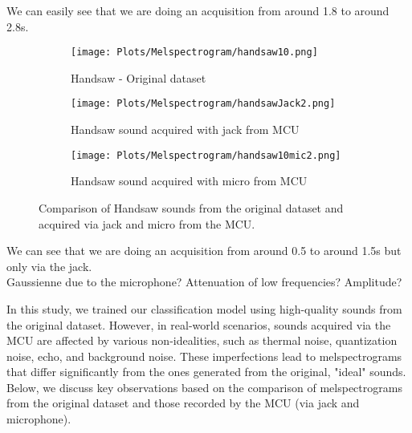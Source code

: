 \documentclass{article}
\begin{document}
We can easily see that we are doing an acquisition from around 1.8 to around 2.8s.
\begin{figure}[H]
    \centering
    \begin{subfigure}{0.35\linewidth} %
        \centering
        \texttt{[image: Plots/Melspectrogram/handsaw10.png]}
        \caption{Handsaw - Original dataset}
    \end{subfigure}
    \hfill
    \begin{subfigure}{0.27\linewidth} %
        \centering
        \texttt{[image: Plots/Melspectrogram/handsawJack2.png]}
        \caption{Handsaw sound acquired with jack from MCU}
    \end{subfigure}
    \hfill
    \begin{subfigure}{0.27\linewidth} %
        \centering
        \texttt{[image: Plots/Melspectrogram/handsaw10mic2.png]}
        \caption{Handsaw sound acquired with micro from MCU}
    \end{subfigure}
    \caption{Comparison of Handsaw sounds from the original dataset and  acquired via jack and micro from the MCU.}
\end{figure}
We can see that we are doing an acquisition from around 0.5 to around 1.5s but only via the jack.\\
Gaussienne due to the microphone? Attenuation of low frequencies? Amplitude?


In this study, we trained our classification model using high-quality sounds from the original dataset. However, in real-world scenarios, sounds acquired via the MCU are affected by various non-idealities, such as thermal noise, quantization noise, echo, and background noise. These imperfections lead to melspectrograms that differ significantly from the ones generated from the original, "ideal" sounds. Below, we discuss key observations based on the comparison of melspectrograms from the original dataset and those recorded by the MCU (via jack and microphone).
\end{document}

